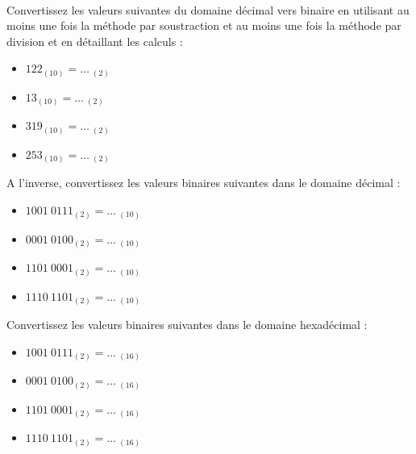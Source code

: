 \documentclass[10pt,fleqn]{article} %
\begin{document}
\begin{exercise}~

\begin{question}
Convertissez les valeurs suivantes du domaine décimal vers binaire en utilisant au moins une fois la méthode par soustraction et au moins une fois la méthode par division et en détaillant les calculs : 
  \begin{itemize}
      \item $122_{(10)} = \dots~_{(2)}$
      \item $13_{(10)} = \dots~_{(2)}$
      \item $319_{(10)} = \dots~_{(2)}$
      \item $253_{(10)} = \dots~_{(2)}$
  \end{itemize}
\end{question} 


\begin{question}
A l'inverse, convertissez les valeurs binaires suivantes dans le domaine décimal : 
\begin{itemize}
    \item $1001~0111 _{(2)}  = \dots~_{(10)}$
    \item $0001~0100 _{(2)}  = \dots~_{(10)} $
    \item $1101~0001 _{(2)} = \dots~_{(10)} $
    \item $1110~1101 _{(2)} = \dots~_{(10)} $
\end{itemize}
\end{question}

\begin{question}
Convertissez les valeurs binaires suivantes dans le domaine hexadécimal : 
\begin{itemize}
    \item $1001~0111 _{(2)}  = \dots~_{(16)}$
    \item $0001~0100 _{(2)}  = \dots~_{(16)} $
    \item $1101~0001 _{(2)} = \dots~_{(16)} $
    \item $1110~1101 _{(2)} = \dots~_{(16)} $
\end{itemize}
\end{question}
\end{exercise}
\end{document}
